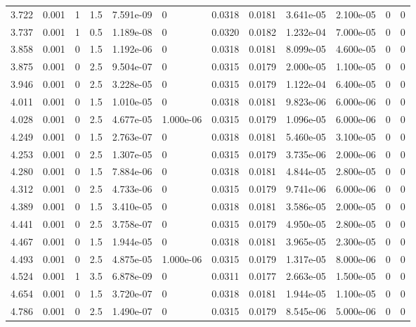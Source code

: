 \documentclass[preview]{standalone}
\begin{document}
{{{\begin{tabular}{L{1.2cm}C{1.2cm} C{0.3cm}C{0.5cm} C{1.4cm}C{1.4cm} C{1.4cm}C{1.4cm} C{1.6cm}C{1.6cm} C{1.6cm}C{1.6cm}}
  3.722  &  0.001  & 1     & 1.5 &  7.591e-09  & 0  &  0.0318&   0.0181& 3.641e-05 & 2.100e-05   &  0 & 0  \\ 
  3.737  &  0.001  & 1     & 0.5 &  1.189e-08  & 0  &  0.0320&   0.0182& 1.232e-04 & 7.000e-05   &  0 & 0  \\ 
  3.858  &  0.001  & 0     & 1.5 &  1.192e-06  & 0  &  0.0318&   0.0181& 8.099e-05 & 4.600e-05   &  0 & 0  \\ 
  3.875  &  0.001  & 0     & 2.5 &  9.504e-07  & 0  &  0.0315&   0.0179& 2.000e-05 & 1.100e-05   &  0 & 0  \\ 
  3.946  &  0.001  & 0     & 2.5 &  3.228e-05  & 0  &  0.0315&   0.0179& 1.122e-04 & 6.400e-05   &  0 & 0  \\ 
  4.011  &  0.001  & 0     & 1.5 &  1.010e-05  & 0  &  0.0318&   0.0181& 9.823e-06 & 6.000e-06   &  0 & 0  \\ 
  4.028  &  0.001  & 0     & 2.5 &  4.677e-05  & 1.000e-06  &  0.0315&   0.0179& 1.096e-05 & 6.000e-06   &  0 & 0  \\ 
  4.249  &  0.001  & 0     & 1.5 &  2.763e-07  & 0  &  0.0318&   0.0181& 5.460e-05 & 3.100e-05   &  0 & 0  \\ 
  4.253  &  0.001  & 0     & 2.5 &  1.307e-05  & 0  &  0.0315&   0.0179& 3.735e-06 & 2.000e-06   &  0 & 0  \\ 
  4.280  &  0.001  & 0     & 1.5 &  7.884e-06  & 0  &  0.0318&   0.0181& 4.844e-05 & 2.800e-05   &  0 & 0  \\ 
  4.312  &  0.001  & 0     & 2.5 &  4.733e-06  & 0  &  0.0315&   0.0179& 9.741e-06 & 6.000e-06   &  0 & 0  \\ 
  4.389  &  0.001  & 0     & 1.5 &  3.410e-05  & 0  &  0.0318&   0.0181& 3.586e-05 & 2.000e-05   &  0 & 0  \\ 
  4.441  &  0.001  & 0     & 2.5 &  3.758e-07  & 0  &  0.0315&   0.0179& 4.950e-05 & 2.800e-05   &  0 & 0  \\ 
  4.467  &  0.001  & 0     & 1.5 &  1.944e-05  & 0  &  0.0318&   0.0181& 3.965e-05 & 2.300e-05   &  0 & 0  \\ 
  4.493  &  0.001  & 0     & 2.5 &  4.875e-05  & 1.000e-06  &  0.0315&   0.0179& 1.317e-05 & 8.000e-06   &  0 & 0  \\ 
  4.524  &  0.001  & 1     & 3.5 &  6.878e-09  & 0  &  0.0311&   0.0177& 2.663e-05 & 1.500e-05   &  0 & 0  \\ 
  4.654  &  0.001  & 0     & 1.5 &  3.720e-07  & 0  &  0.0318&   0.0181& 1.944e-05 & 1.100e-05   &  0 & 0  \\ 
  4.786  &  0.001  & 0     & 2.5 &  1.490e-07  & 0  &  0.0315&   0.0179& 8.545e-06 & 5.000e-06   &  0 & 0  \\ 

\end{tabular}}}}
\end{document}
